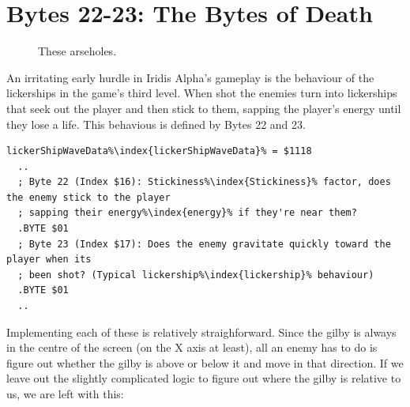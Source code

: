 \section{Bytes 22-23: The Bytes of Death}
\begin{figure}[H]
  {
    \setlength{\tabcolsep}{3.0pt}
    \setlength\cmidrulewidth{\heavyrulewidth} %
	\centering
	\def\MULTICOLORONE{white}
	\def\MULTICOLORTWO{red}
	\def\SPRITECOLOR{gray}
	\begin{subfigure}{0.3\textwidth}
		
	\end{subfigure}
	\begin{subfigure}{0.3\textwidth}
		
	\end{subfigure}
	\begin{subfigure}{0.3\textwidth}
		
	\end{subfigure}
  }\caption[position=top]{These arseholes.}
\end{figure}

An irritating early hurdle in Iridis Alpha's gameplay is the behaviour of the lickerships in the game's third level.
When shot the enemies turn into lickerships that seek out the player and then stick to them, sapping the player's energy
until they lose a life. This behavious is defined by Bytes 22 and 23. 

\begin{lstlisting}[escapechar=\%]
lickerShipWaveData%\index{lickerShipWaveData}% = $1118
  ..
  ; Byte 22 (Index $16): Stickiness%\index{Stickiness}% factor, does the enemy stick to the player
  ; sapping their energy%\index{energy}% if they're near them?
  .BYTE $01
  ; Byte 23 (Index $17): Does the enemy gravitate quickly toward the player when its
  ; been shot? (Typical lickership%\index{lickership}% behaviour)
  .BYTE $01
  ..
\end{lstlisting}

Implementing each of these is relatively straighforward. Since the gilby is always in the centre of the screen (on the
X axis at least), all an enemy has to do is figure out whether the gilby is above or below it and move in that direction.
If we leave out the slightly complicated logic to figure out where the gilby is relative to us, we are left with this:

